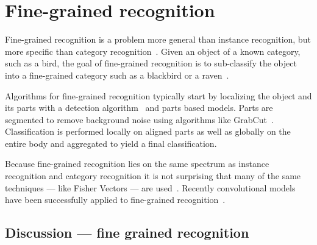 \section{Fine-grained recognition}\label{sec:fgr}  

    Fine-grained recognition is a problem more general than instance
      recognition, but more specific than category
      recognition~\cite{parkhi_cats_2012, berg_poof_2013,
      gavves_local_2014}.
    Given an object of a known category, such as a bird, the goal of
      fine-grained recognition is to sub-classify the object into a
      fine-grained category such as a blackbird or a
      raven~\cite{berg_how_2013}.

    Algorithms for fine-grained recognition typically start by
      localizing the object and its parts with a detection
      algorithm~\cite{dalal_histograms_2005} and parts based models.
    Parts are segmented to remove background noise using algorithms
      like GrabCut~\cite{rother_grabcut_2004}.
    Classification is performed locally on aligned parts as well as
      globally on the entire body and aggregated to yield a final
      classification.

    Because fine-grained recognition lies on the same spectrum as
      instance recognition and category recognition it is not surprising
      that many of the same techniques --- like Fisher Vectors --- are
      used~\cite{gosselin_revisiting_2014}.
    Recently convolutional models have been successfully applied to
      fine-grained recognition~\cite{catherine_wah_similarity_2014,
      branson_bird_2014, zongyuan_ge_modelling_2015, zhang_weakly_2015,
      xiao_application_2015}.


    \subsection{Discussion --- fine grained recognition}

